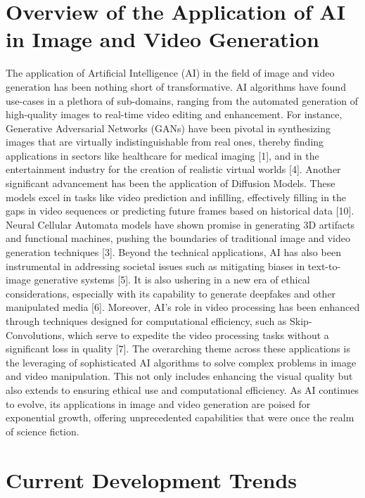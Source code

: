 \documentclass[11pt,a4paper,oneside]{report}
\begin{document}
\section{Overview of the Application of AI in Image and Video Generation}
The application of Artificial Intelligence (AI) in the field of image and video generation has been nothing short of transformative. AI algorithms have found use-cases in a plethora of sub-domains, ranging from the automated generation of high-quality images to real-time video editing and enhancement. For instance, Generative Adversarial Networks (GANs) have been pivotal in synthesizing images that are virtually indistinguishable from real ones, thereby finding applications in sectors like healthcare for medical imaging [1], and in the entertainment industry for the creation of realistic virtual worlds [4]. Another significant advancement has been the application of Diffusion Models. These models excel in tasks like video prediction and infilling, effectively filling in the gaps in video sequences or predicting future frames based on historical data [10]. Neural Cellular Automata models have shown promise in generating 3D artifacts and functional machines, pushing the boundaries of traditional image and video generation techniques [3]. 
Beyond the technical applications, AI has also been instrumental in addressing societal issues such as mitigating biases in text-to- image generative systems [5]. It is also ushering in a new era of ethical considerations, especially with its capability to generate deepfakes and other manipulated media [6]. Moreover, AI's role in video processing has been enhanced through techniques designed for computational efficiency, such as Skip- Convolutions, which serve to expedite the video processing tasks without a significant loss in quality [7]. 
The overarching theme across these applications is the leveraging of sophisticated AI algorithms to solve complex problems in image and video manipulation. This not only includes enhancing the visual quality but also extends to ensuring ethical use and computational efficiency. As AI continues to evolve, its applications in image and video generation are poised for exponential growth, offering unprecedented capabilities that were once the realm of science fiction. 

\section{Current Development Trends}
\end{document}
